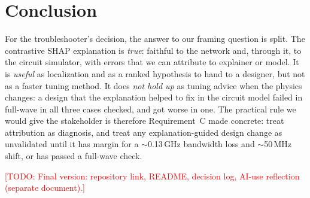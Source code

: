 \documentclass[conference,onecolumn,10pt]{IEEEtran}
\newcommand{\todo}[1]{\textcolor{red}{[TODO: #1]}}
\begin{document}
\section{Conclusion}
For the troubleshooter's decision, the answer to our framing question is split.
The contrastive SHAP explanation is \emph{true}: faithful to the network and, through it, to the circuit simulator, with errors that we can attribute to explainer or model.
It is \emph{useful} as localization and as a ranked hypothesis to hand to a designer, but not as a faster tuning method.
It does \emph{not hold up} as tuning advice when the physics changes: a design that the explanation helped to fix in the circuit model failed in full-wave in all three cases checked, and got worse in one.
The practical rule we would give the stakeholder is therefore Requirement~C made concrete: treat attribution as diagnosis, and treat any explanation-guided design change as unvalidated until it has margin for a $\sim$0.13\,GHz bandwidth loss and $\sim$50\,MHz shift, or has passed a full-wave check.

\todo{Final version: repository link, README, decision log, AI-use reflection (separate document).}



\end{document}
